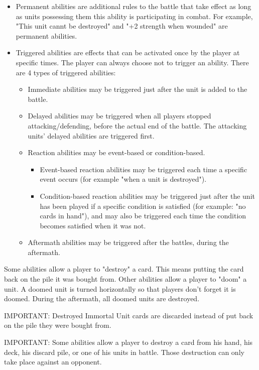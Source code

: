 \documentclass[a4paper]{article}
\begin{document}
    \begin{itemize}
        \item Permanent abilities are additional rules to the battle that take effect as long
            as units possessing them this ability is participating in combat.
            For example, "This unit cannt be destroyed" and "+2 strength when wounded" are permanent abilities.
        \item Triggered abilities are effects that can be activated once by the player at specific times.
            The player can always choose not to trigger an ability.
            There are 4 types of triggered abilities:
            \begin{itemize}
        	        \item Immediate abilities may be triggered just after the unit is added to the battle.
        	        \item Delayed abilities may be triggered when all players stopped attacking/defending,
	            before the actual end of the battle. The attacking units' delayed abilities are triggered first.
        	        \item Reaction abilities may be event-based or condition-based.
	            \begin{itemize}
                        \item Event-based reaction abilities may be triggered each time a specific event occurs
                            (for example "when a unit is destroyed").
                        \item Condition-based reaction abilities may be triggered just after the unit has been played
                            if a specific condition is satisfied (for example: "no cards in hand"), and may also be triggered
                            each time the condition becomes satisfied when it was not.
                    \end{itemize}
        	        \item Aftermath abilities may be triggered after the battles, during the aftermath.
            \end{itemize}
    \end{itemize}

    Some abilities allow a player to "destroy" a card.
    This means putting the card back on the pile it was bought from.
    Other abilities allow a player to "doom" a unit.
    A doomed unit is turned horizontally so that players don't forget it is doomed.
    During the aftermath, all doomed units are destroyed.
    
    IMPORTANT: Destroyed Immortal Unit cards are discarded instead of put back on the pile they were bought from.
    
    IMPORTANT: Some abilities allow a player to destroy a card from his hand, his deck, his discard pile, or one of his units in battle.
        Those destruction can only take place against an opponent.
\end{document}
